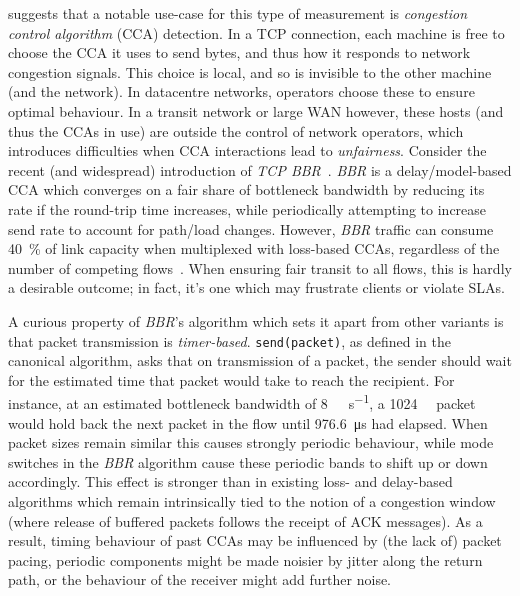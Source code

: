 

 suggests that a notable use-case for this type of measurement is \emph{congestion control algorithm} (CCA) detection.
In a TCP connection, each machine is free to choose the CCA it uses to send bytes, and thus how it responds to network congestion signals.
This choice is local, and so is invisible to the other machine (and the network).
In datacentre networks, operators choose these to ensure optimal behaviour.
In a transit network or large WAN however, these hosts (and thus the CCAs in use) are outside the control of network operators, which introduces difficulties when CCA interactions lead to \emph{unfairness}.
Consider the recent (and widespread) introduction of \emph{TCP BBR}~\parencite{DBLP:journals/queue/CardwellCGYJ16}.
\emph{BBR} is a delay/model-based CCA which converges on a fair share of bottleneck bandwidth by reducing its rate if the round-trip time increases, while periodically attempting to increase send rate to account for path/load changes.
However, \emph{BBR} traffic can consume \SI{40}{\percent} of link capacity when multiplexed with loss-based CCAs, regardless of the number of competing flows~\parencite{DBLP:conf/imc/WareMSS19}. 
When ensuring fair transit to all flows, this is hardly a desirable outcome; in fact, it's one which may frustrate clients or violate SLAs.

A curious property of \emph{BBR}'s algorithm which sets it apart from other variants is that packet transmission is \emph{timer-based}.
\texttt{send(packet)}, as defined in the canonical algorithm, asks that on transmission of a packet, the sender should wait for the estimated time that packet would take to reach the recipient.
For instance, at an estimated bottleneck bandwidth of \SI{8}{\mega\bit\per\second}, a \SI{1024}{\kilo\byte} packet would hold back the next packet in the flow until \SI{976.6}{\micro\second} had elapsed.
When packet sizes remain similar this causes strongly periodic behaviour, while mode switches in the \emph{BBR} algorithm cause these periodic bands to shift up or down accordingly.
This effect is stronger than in existing loss- and delay-based algorithms which remain intrinsically tied to the notion of a congestion window (where release of buffered packets follows the receipt of ACK messages).
As a result, timing behaviour of past CCAs may be influenced by (the lack of) packet pacing, periodic components might be made noisier by jitter along the return path, or the behaviour of the receiver might add further noise.

